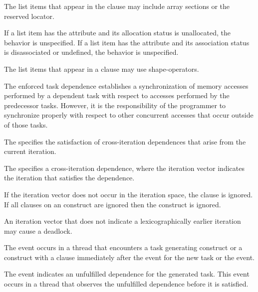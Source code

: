 The list items that appear in the  clause may include array
sections or the  reserved locator.

\begin{fortranspecific}
If a list item has the  attribute and its allocation
status is unallocated, the behavior is unspecified. If a list item has
the  attribute and its association status is
disassociated or undefined, the behavior is unspecified.
\end{fortranspecific}

\begin{ccppspecific}
The list items that appear in a  clause may use shape-operators.
\end{ccppspecific}

\begin{note}
The enforced task dependence establishes a synchronization of memory
accesses performed by a dependent task with respect to accesses performed by the
predecessor tasks. However, it is the responsibility of the programmer to synchronize properly with respect to other concurrent accesses that occur outside of those tasks.
\end{note}

The   specifies the satisfaction of
cross-iteration dependences that arise from the current iteration.

The   specifies a cross-iteration dependence,
where the iteration vector  indicates the iteration that satisfies
the dependence.

If the iteration vector  does not occur in the iteration space,
the  clause is ignored.  If all  clauses on an
 construct are ignored then the construct is ignored.

\begin{note}
An iteration vector  that does not indicate a lexicographically 
earlier iteration may cause a deadlock.
\end{note}

\events

The  event occurs in a thread that encounters a
task generating construct or a  construct with a  
clause immediately after the  event for the new task or 
the  event.

The  event indicates an unfulfilled dependence for the 
generated task. This event occurs in a thread that observes the unfulfilled 
dependence before it is satisfied. 

